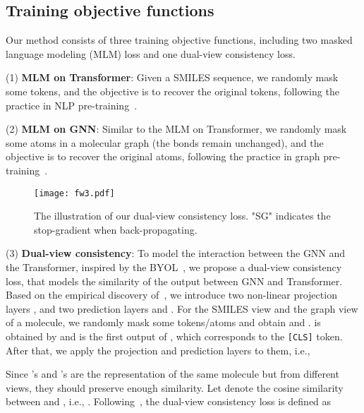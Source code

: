 \documentclass{article}
\begin{document}
\subsection{Training objective functions}
Our method consists of three training objective functions, including two masked language modeling (MLM) loss and one dual-view consistency loss.

\noindent(1) {\bf MLM on Transformer}: Given a SMILES sequence, we randomly mask some tokens, and the objective is to recover  the original tokens, following the practice in NLP pre-training~\cite{devlin2018bert,liu2019roberta}.

\iffalse
After applying random masking to , denote the corrupted sequence as . Mathematically, the MLM loss of the Transformer branch is

where  is the indicator function.
\fi

\noindent(2) {\bf MLM on GNN}: Similar to the MLM on Transformer, we randomly mask some atoms in a molecular graph (the bonds remain unchanged), and the objective is to recover the original atoms, following the practice in graph pre-training~\cite{hu2019strategies}.


\iffalse
\noindent(2) {\bf MLM on Graphs}: Similar to the MLM on Transformer, define the augmented version of the graph  as , where we randomly replace some atoms to \texttt{[mask]} while the bonds remain unchanged. Denote the corrupted atoms as .  The MLM loss for graph is:

\fi
\begin{figure}[!ht]
    \centering
    \texttt{[image: fw3.pdf]}
    \caption{The illustration of our dual-view consistency loss. "SG" indicates the stop-gradient when back-propagating.}
    \label{fig:framework}
\end{figure}
\noindent(3) \textbf{Dual-view consistency}: To model the interaction between the GNN and the Transformer, inspired by the BYOL~\cite{BYOL2020}, we propose a dual-view consistency loss, that models the similarity of the output between GNN and Transformer. Based on the empirical discovery of~\cite{BYOL2020}, we introduce two non-linear projection layers ,  and two prediction layers  and . For the SMILES view  and 
the graph view  of a molecule, we randomly mask some tokens/atoms and obtain  and .
 is obtained by  and  is the first output of , which corresponds to the \texttt{[CLS]} token.
After that, we  apply the projection and prediction layers to them, i.e., 

Since 's and 's are the representation of the same molecule but from different views, they should preserve enough similarity. Let  denote the cosine similarity between  and , i.e., . Following~\cite{BYOL2020}, the dual-view consistency loss is defined as 
\end{document}
